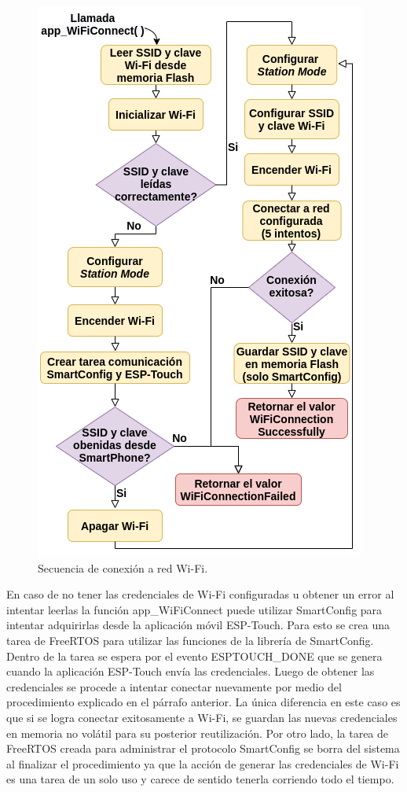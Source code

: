 \begin{figure}[ht]
	\centering
	\includegraphics[scale=0.95]{./Figures/WiFi.png}
	\caption{Secuencia de conexión a red Wi-Fi.}
	\label{fig:WiFi}
\end{figure}

En caso de no tener las credenciales de Wi-Fi configuradas u obtener un error al intentar leerlas la función app\_WiFiConnect puede utilizar SmartConfig para intentar adquirirlas desde la aplicación móvil ESP-Touch. Para esto se crea una tarea de FreeRTOS para utilizar las funciones de la librería de SmartConfig. Dentro de la tarea se espera por el evento ESPTOUCH\_DONE que se genera cuando la aplicación ESP-Touch envía las credenciales. Luego de obtener las credenciales se procede a intentar conectar nuevamente por medio del procedimiento explicado en el párrafo anterior. La única diferencia en este caso es que si se logra conectar exitosamente a Wi-Fi, se guardan las nuevas credenciales en memoria no volátil para su posterior reutilización. Por otro lado, la tarea de FreeRTOS creada para administrar el protocolo SmartConfig se borra del sistema al finalizar el procedimiento ya que la acción de generar las credenciales de Wi-Fi es una tarea de un solo uso y carece de sentido tenerla corriendo todo el tiempo.


